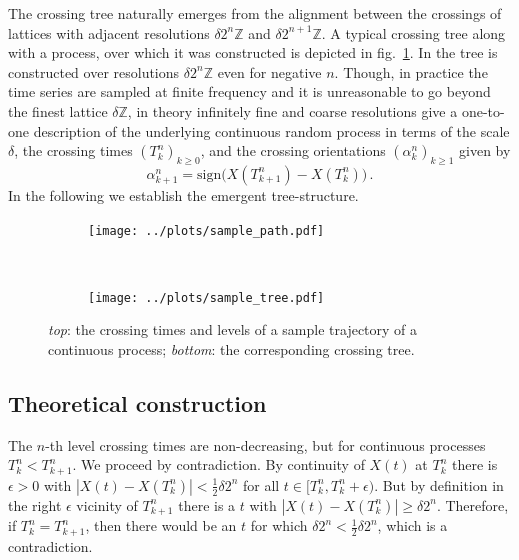 \documentclass[a4paper]{article}
\begin{document}
The crossing tree naturally emerges from the alignment between the crossings of
lattices with adjacent resolutions $\delta 2^n \mathbb{Z}$ and $\delta 2^{n+1} \mathbb{Z}$.
A typical crossing tree along with a process, over which it was constructed is depicted
in fig.~\ref{fig:sample_tree}. In \cite{decrouez2013,ECP1673} the tree is constructed
over resolutions $\delta 2^n \mathbb{Z}$ even for negative $n$. Though, in practice
the time series are sampled at finite frequency and it is unreasonable to go beyond
the finest lattice $\delta \mathbb{Z}$, in theory infinitely fine and coarse resolutions
give a one-to-one description of the underlying continuous random process in terms
of the scale $\delta$, the crossing times $(T_k^n)_{k\geq 0}$, and the crossing
orientations $(\alpha_k^n)_{k\geq 1}$ given by
\begin{equation*} \label{eq:xing_orientations}
    \alpha_{k+1}^n = \text{sign}\bigl( X(T_{k+1}^n) - X(T_k^n) \bigr) \,.
\end{equation*}
In the following we establish the emergent tree-structure.

\begin{figure}[ht]
    \centering
    \begin{subfigure}{\linewidth}
        \texttt{[image: ../plots/sample\_path.pdf]}
    \end{subfigure}\\
    \vspace{-20pt}
    \begin{subfigure}{\linewidth}
        \texttt{[image: ../plots/sample\_tree.pdf]}
    \end{subfigure}
    \vspace{-10pt}
    \caption{\emph{top}: the crossing times and levels of a sample trajectory of
    a continuous process; \emph{bottom}: the corresponding crossing tree.}
    \label{fig:sample_tree}
    \vspace{-10pt}
\end{figure}

\subsection{Theoretical construction} %
\label{sub:theoretical_construction}

The $n$-th level crossing times are non-decreasing, but for continuous processes
$T_k^n < T_{k+1}^n$. We proceed by contradiction. By continuity of $X(t)$ at $T_k^n$
there is $\epsilon>0$ with $|X(t) - X(T_k^n)| < \frac{1}{2}\delta 2^n$ for all
$t\in [T_k^n, T_k^n + \epsilon)$. But by definition in the right $\epsilon$ vicinity
of $T_{k+1}^n$ there is a $t$ with $|X(t) - X(T_k^n)|\geq \delta 2^n$. Therefore,
if $T_k^n = T_{k+1}^n$, then there would be an $t$ for which $\delta 2^n < \frac{1}{2}\delta 2^n$,
which is a contradiction.
\end{document}
